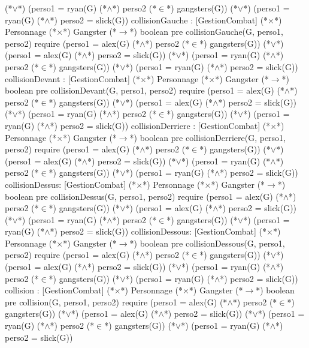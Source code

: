 \documentclass[a4paper, 11pt]{report}
\begin{document}
\begin{Spe}
            (*$\lor$*) (perso1 = ryan(G) (*$\land$*) perso2 (*$\in$*) gangsters(G))
            (*$\lor$*) (perso1 = ryan(G) (*$\land$*) perso2 = slick(G))
      collisionGauche : [GestionCombat] (*$\times$*) Personnage (*$\times$*) Gangster (*$\rightarrow$*) boolean
            pre collisionGauche(G, perso1, perso2) require (perso1 = alex(G) (*$\land$*) perso2 (*$\in$*) gangsters(G))
            (*$\lor$*) (perso1 = alex(G) (*$\land$*) perso2 = slick(G))
            (*$\lor$*) (perso1 = ryan(G) (*$\land$*) perso2 (*$\in$*) gangsters(G))
            (*$\lor$*) (perso1 = ryan(G) (*$\land$*) perso2 = slick(G))
      collisionDevant : [GestionCombat] (*$\times$*) Personnage (*$\times$*) Gangster (*$\rightarrow$*) boolean
            pre collisionDevant(G, perso1, perso2) require (perso1 = alex(G) (*$\land$*) perso2 (*$\in$*) gangsters(G))
            (*$\lor$*) (perso1 = alex(G) (*$\land$*) perso2 = slick(G))
            (*$\lor$*) (perso1 = ryan(G) (*$\land$*) perso2 (*$\in$*) gangsters(G))
            (*$\lor$*) (perso1 = ryan(G) (*$\land$*) perso2 = slick(G))
      collisionDerriere : [GestionCombat] (*$\times$*) Personnage (*$\times$*) Gangster (*$\rightarrow$*) boolean
            pre collisionDerriere(G, perso1, perso2) require (perso1 = alex(G) (*$\land$*) perso2 (*$\in$*) gangsters(G))
            (*$\lor$*) (perso1 = alex(G) (*$\land$*) perso2 = slick(G))
            (*$\lor$*) (perso1 = ryan(G) (*$\land$*) perso2 (*$\in$*) gangsters(G))
            (*$\lor$*) (perso1 = ryan(G) (*$\land$*) perso2 = slick(G))
      collisionDessus: [GestionCombat] (*$\times$*) Personnage (*$\times$*) Gangster (*$\rightarrow$*) boolean
            pre collisionDessus(G, perso1, perso2) require (perso1 = alex(G) (*$\land$*) perso2 (*$\in$*) gangsters(G))
            (*$\lor$*) (perso1 = alex(G) (*$\land$*) perso2 = slick(G))
            (*$\lor$*) (perso1 = ryan(G) (*$\land$*) perso2 (*$\in$*) gangsters(G))
            (*$\lor$*) (perso1 = ryan(G) (*$\land$*) perso2 = slick(G))
      collisionDessous: [GestionCombat] (*$\times$*) Personnage (*$\times$*) Gangster (*$\rightarrow$*) boolean
            pre collisionDessous(G, perso1, perso2) require (perso1 = alex(G) (*$\land$*) perso2 (*$\in$*) gangsters(G))
            (*$\lor$*) (perso1 = alex(G) (*$\land$*) perso2 = slick(G))
            (*$\lor$*) (perso1 = ryan(G) (*$\land$*) perso2 (*$\in$*) gangsters(G))
            (*$\lor$*) (perso1 = ryan(G) (*$\land$*) perso2 = slick(G))
      collision : [GestionCombat] (*$\times$*) Personnage (*$\times$*) Gangster (*$\rightarrow$*) boolean
            pre collision(G, perso1, perso2) require 
            (perso1 = alex(G) (*$\land$*) perso2 (*$\in$*) gangsters(G))
            (*$\lor$*) (perso1 = alex(G) (*$\land$*) perso2 = slick(G))
            (*$\lor$*) (perso1 = ryan(G) (*$\land$*) perso2 (*$\in$*) gangsters(G))
            (*$\lor$*) (perso1 = ryan(G) (*$\land$*) perso2 = slick(G))


\end{Spe}
\end{document}
